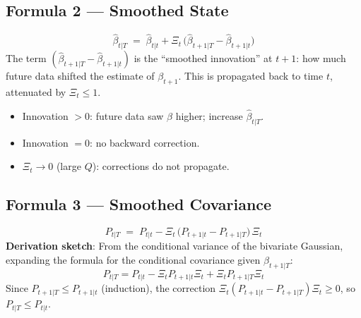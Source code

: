 \documentclass[10pt,a4paper,twocolumn]{article}
\begin{document}
\subsection{Formula 2 --- Smoothed State}

\begin{tcolorbox}[mathbox={Formula 2 --- Smoothed State}]
\vspace{-4pt}
\begin{equation}\label{eq:smooth_state}
  \boxed{
    \hat\beta_{t|T} \;=\; \hat\beta_{t|t}
      + \Xi_t\,\bigl(\hat\beta_{t+1|T} - \hat\beta_{t+1|t}\bigr)
  }
\end{equation}
\vspace{-3pt}
The term $(\hat\beta_{t+1|T} - \hat\beta_{t+1|t})$ is the
``smoothed innovation'' at $t+1$: how much future data
shifted the estimate of $\beta_{t+1}$.  This is propagated
back to time $t$, attenuated by $\Xi_t \leq 1$.
\begin{itemize}\setlength\itemsep{0pt}
  \item Innovation $> 0$: future data saw $\beta$ higher; increase $\hat\beta_{t|T}$.
  \item Innovation $= 0$: no backward correction.
  \item $\Xi_t \to 0$ (large $Q$): corrections do not propagate.
\end{itemize}
\end{tcolorbox}

\subsection{Formula 3 --- Smoothed Covariance}

\begin{tcolorbox}[mathbox={Formula 3 --- Smoothed Covariance}]
\vspace{-4pt}
\begin{equation}\label{eq:smooth_cov}
  \boxed{
    P_{t|T} \;=\; P_{t|t}
      - \Xi_t\,\bigl(P_{t+1|t} - P_{t+1|T}\bigr)\,\Xi_t
  }
\end{equation}
\vspace{-3pt}
\textbf{Derivation sketch}: From the conditional variance of
the bivariate Gaussian, expanding the formula for the
conditional covariance given $\beta_{t+1|T}$:
\[
  P_{t|T}
  = P_{t|t} - \Xi_t P_{t+1|t}\Xi_t + \Xi_t P_{t+1|T}\Xi_t
\]
Since $P_{t+1|T} \leq P_{t+1|t}$ (induction), the correction
$\Xi_t(P_{t+1|t}-P_{t+1|T})\Xi_t \geq 0$, so $P_{t|T} \leq P_{t|t}$.
\end{tcolorbox}
\end{document}
